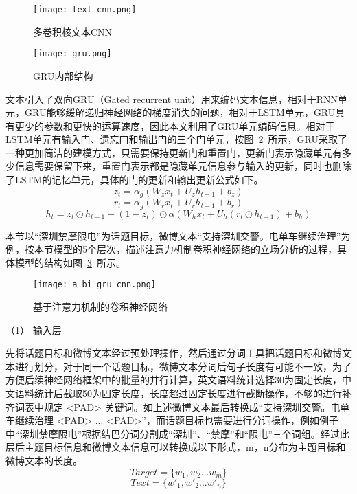 \begin{figure}[htbp]
	\centering
	\texttt{[image: text\_cnn.png]}
	\caption{多卷积核文本CNN}
	\label{multiCNN}
\end{figure}

\begin{figure}[htbp]
	\centering
	\texttt{[image: gru.png]}
	\caption[rnn_vanish]{GRU内部结构}
	\label{gru}
\end{figure}
文本引入了双向GRU（Gated recurrent unit）用来编码文本信息，相对于RNN单元，GRU能够缓解递归神经网络的梯度消失的问题，相对于LSTM单元，GRU具有更少的参数和更快的运算速度，因此本文利用了GRU单元编码信息。相对于LSTM单元有输入门、遗忘门和输出门的三个门单元，按图~\ref{gru}~所示，GRU采取了一种更加简洁的建模方式，只需要保持更新门和重置门，更新门表示隐藏单元有多少信息需要保留下来，重置门表示都是隐藏单元信息参与输入的更新，同时也删除了LSTM的记忆单元，具体的门的更新和输出更新公式如下。
\begin{equation}\label{conv1} z_t=\alpha_g(W_zx_t+U_zh_{t-1}+b_z) \end{equation}
\begin{equation}\label{conv1} r_t=\alpha_g(W_rx_t+U_rh_{t-1}+b_r) \end{equation}
\begin{equation}\label{conv1} h_t=z_t\odot h_{t-1} + (1-z_t)\odot \alpha(W_hx_t+U_h(r_t\odot h_{t-1})+b_h) \end{equation}

本节以“深圳禁摩限电”为话题目标，微博文本“支持深圳交警。电单车继续治理”为例，按本节模型的5个层次，描述注意力机制卷积神经网络的立场分析的过程，具体模型的结构如图~\ref{GRU_CNN}~所示。

\begin{figure}[htbp]
	\centering
	\texttt{[image: a\_bi\_gru\_cnn.png]}
	\caption[]{基于注意力机制的卷积神经网络}
	\label{GRU_CNN}
\end{figure}

（1） 输入层

先将话题目标和微博文本经过预处理操作，然后通过分词工具把话题目标和微博文本进行划分，对于同一个话题目标，微博文本分词后句子长度有可能不一致，为了方便后续神经网络框架中的批量的并行计算，英文语料统计选择30为固定长度，中文语料统计后截取50为固定长度，长度超过固定长度进行截断操作，不够的进行补齐词表中规定 <PAD> 关键词。如上述微博文本最后转换成“支持深圳交警。电单车继续治理 <PAD> ... <PAD>”，而话题目标也需要进行分词操作，例如例子中“深圳禁摩限电”根据结巴分词分割成“深圳”、“禁摩”和“限电”三个词组。经过此层后主题目标信息和微博文本信息可以转换成以下形式，m，n分布为主题目标和微博文本的长度。
\begin{equation}\label{target_info} Target= \lbrace w_1,w_2...w_m\rbrace \end{equation}
\begin{equation}\label{text_info} Text=\lbrace w'_1,w'_2...w'_n\rbrace  \end{equation}

